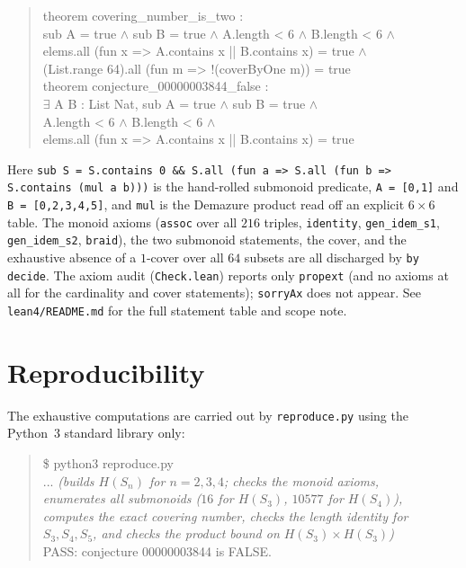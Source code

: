 \documentclass[11pt]{article}
\theoremstyle{definition}
\theoremstyle{remark}
\begin{document}
\begin{quote}\ttfamily
theorem covering\_number\_is\_two :\\
\hspace*{2em}sub A = true \(\wedge\) sub B = true \(\wedge\) A.length < 6 \(\wedge\) B.length < 6 \(\wedge\)\\
\hspace*{2em}elems.all (fun x => A.contains x || B.contains x) = true \(\wedge\)\\
\hspace*{2em}(List.range 64).all (fun m => !(coverByOne m)) = true\\
theorem conjecture\_00000003844\_false :\\
\hspace*{2em}\(\exists\) A B : List Nat, sub A = true \(\wedge\) sub B = true \(\wedge\)\\
\hspace*{2em}A.length < 6 \(\wedge\) B.length < 6 \(\wedge\)\\
\hspace*{2em}elems.all (fun x => A.contains x || B.contains x) = true
\end{quote}

Here \texttt{sub S = S.contains 0 \&\& S.all (fun a => S.all (fun b => S.contains (mul a b)))}
is the hand-rolled submonoid predicate, \texttt{A = [0,1]} and
\texttt{B = [0,2,3,4,5]}, and \texttt{mul} is the Demazure product read off an
explicit $6\times6$ table. The monoid axioms (\texttt{assoc} over all $216$
triples, \texttt{identity}, \texttt{gen\_idem\_s1}, \texttt{gen\_idem\_s2},
\texttt{braid}), the two submonoid statements, the cover, and the exhaustive
absence of a $1$-cover over all $64$ subsets are all discharged by
\texttt{by decide}. The axiom audit (\texttt{Check.lean}) reports only
\texttt{propext} (and no axioms at all for the cardinality and cover
statements); \texttt{sorryAx} does not appear. See \texttt{lean4/README.md} for
the full statement table and scope note.

\section{Reproducibility}

The exhaustive computations are carried out by \texttt{reproduce.py} using the
Python~3 standard library only:

\begin{quote}\ttfamily
\$ python3 reproduce.py\\
... \textit{(builds $H(S_n)$ for $n=2,3,4$; checks the monoid axioms,}\\
\textit{enumerates all submonoids ($16$ for $H(S_3)$, $10577$ for $H(S_4)$),}\\
\textit{computes the exact covering number, checks the length identity for}\\
\textit{$S_3,S_4,S_5$, and checks the product bound on $H(S_3)\times H(S_3)$)}\\
PASS: conjecture 00000003844 is FALSE.
\end{quote}
\end{document}
